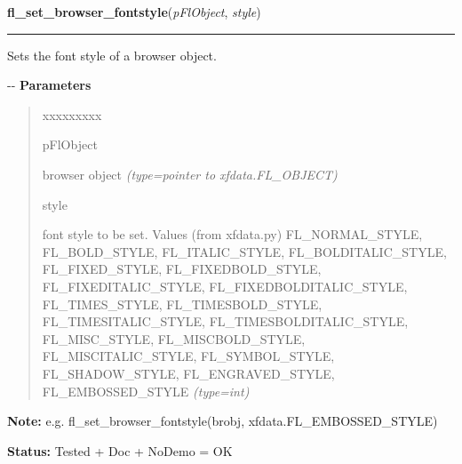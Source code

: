 \hspace{.8\funcindent}\begin{boxedminipage}{\funcwidth}

    \raggedright \textbf{fl\_set\_browser\_fontstyle}(\textit{pFlObject}, \textit{style})

    \vspace{-1.5ex}

    \rule{\textwidth}{0.5\fboxrule}
\setlength{\parskip}{2ex}

Sets the font style of a browser object.

-{}-
\setlength{\parskip}{1ex}
      \textbf{Parameters}
      \vspace{-1ex}

      \begin{quote}
        \begin{Ventry}{xxxxxxxxx}

          \item[pFlObject]


browser object
            {\it (type=pointer to xfdata.FL\_OBJECT)}

          \item[style]


font style to be set. Values (from xfdata.py) FL\_NORMAL\_STYLE,
FL\_BOLD\_STYLE, FL\_ITALIC\_STYLE, FL\_BOLDITALIC\_STYLE, FL\_FIXED\_STYLE,
FL\_FIXEDBOLD\_STYLE, FL\_FIXEDITALIC\_STYLE, FL\_FIXEDBOLDITALIC\_STYLE,
FL\_TIMES\_STYLE, FL\_TIMESBOLD\_STYLE, FL\_TIMESITALIC\_STYLE,
FL\_TIMESBOLDITALIC\_STYLE, FL\_MISC\_STYLE, FL\_MISCBOLD\_STYLE,
FL\_MISCITALIC\_STYLE, FL\_SYMBOL\_STYLE, FL\_SHADOW\_STYLE,
FL\_ENGRAVED\_STYLE, FL\_EMBOSSED\_STYLE
            {\it (type=int)}

        \end{Ventry}

      \end{quote}

\textbf{Note:} 
e.g. fl\_set\_browser\_fontstyle(brobj, xfdata.FL\_EMBOSSED\_STYLE)


\textbf{Status:} 
Tested + Doc + NoDemo = OK


    \end{boxedminipage}

    \label{xformslib:flbrowser:fl_set_browser_specialkey}

    \vspace{0.5ex}

